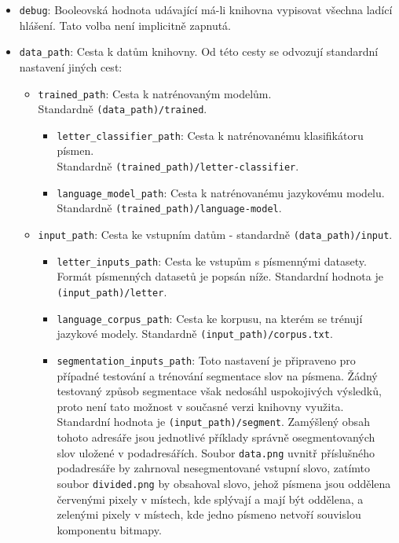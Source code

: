 \documentclass[a4paper]{article}
\begin{document}
\begin{itemize}
\item \texttt{debug}: Booleovská hodnota udávající má-li knihovna vypisovat
	všechna ladící hlášení. Tato volba není implicitně zapnutá.
\item \texttt{data\_path}: Cesta k datům knihovny. Od této cesty se odvozují
	standardní nastavení jiných cest:
	\begin{itemize}
	\item \texttt{trained\_path}: Cesta k natrénovaným modelům. \\
		Standardně \texttt{(data\_path)/trained}.
		\begin{itemize}
		\item \texttt{letter\_classifier\_path}: Cesta k natrénovanému
			klasifikátoru písmen. \\ Standardně
			\texttt{(trained\_path)/letter-classifier}.
		\item \texttt{language\_model\_path}: Cesta k natrénovanému
			jazykovému modelu. \\
			Standardně
			\texttt{(trained\_path)/language-model}.
		\end{itemize}
	\item \texttt{input\_path}: Cesta ke vstupním datům - standardně
		\texttt{(data\_path)/input}.
		\begin{itemize}
		\item \texttt{letter\_inputs\_path}: Cesta ke vstupům s
			písmennými datasety. Formát písmenných datasetů je
			popsán níže. Standardní hodnota je
			\texttt{(input\_path)/letter}.

		\item \texttt{language\_corpus\_path}: Cesta ke korpusu,
			na kterém se trénují jazykové modely.
			Standardně \texttt{(input\_path)/corpus.txt}.

		\item
			\texttt{segmentation\_inputs\_path}: Toto nastavení
			je připraveno pro případné testování a trénování
			segmentace slov na písmena. Žádný
			testovaný způsob segmentace však nedosáhl uspokojivých
			výsledků, proto není tato možnost v současné verzi knihovny využita.
			Standardní hodnota je \texttt{(input\_path)/segment}.
			Zamýšlený obsah tohoto adresáře jsou jednotlivé příklady
			správně osegmentovaných slov uložené v podadresářích.
			Soubor \texttt{data.png} uvnitř příslušného podadresáře
			by zahrnoval nesegmentované vstupní slovo, zatímto
			soubor \texttt{divided.png} by obsahoval slovo, jehož
			písmena jsou oddělena červenými pixely v místech, kde
			splývají a mají být oddělena, a zelenými pixely v
			místech, kde jedno písmeno netvoří souvislou komponentu
			bitmapy.
		\end{itemize}
	\end{itemize}
\end{itemize}
\end{document}
